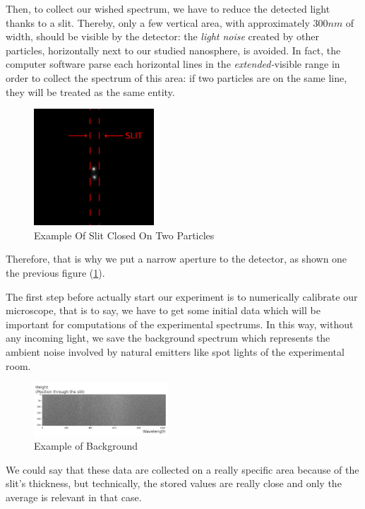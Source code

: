 \documentclass{article}
\numberwithin{equation}{section}
\begin{document}
Then, to collect our wished spectrum, we have to reduce the detected light thanks to a slit. Thereby, only a few vertical area, with approximately $300 nm$ of width, should be visible by the detector: the \textit{light noise} created by other particles, horizontally next to our studied nanosphere, is avoided. In fact, the computer software parse each horizontal lines in the \textit{extended-}visible range in order to collect the spectrum of this area: if two particles are on the same line, they will be treated as the same entity.
\begin{figure}[h]
    \centering
    \includegraphics[width=0.4\textwidth, height=0.35\textwidth]{slit_ex.png}
    \caption{Example Of Slit Closed On Two Particles}
    \label{fig:slit_ex}
\end{figure}
Therefore, that is why we put a narrow aperture to the detector, as shown one the previous figure (\ref{fig:slit_ex}).

The first step before actually start our experiment is to numerically calibrate our microscope, that is to say, we have to get some initial data which will be important for computations of the experimental spectrums. In this way, without any incoming light, we save the background spectrum which represents the ambient noise involved by natural emitters like spot lights of the experimental room.
\begin{figure}[h]
    \centering
    \includegraphics[width=0.45\textwidth, height=0.20\textwidth]{background_ex.png}
    \caption{Example of Background}
    \label{fig:background_ex}
\end{figure}
We could say that these data are collected on a really specific area because of the slit's thickness, but technically, the stored values are really close and only the average is relevant in that case.
\end{document}
